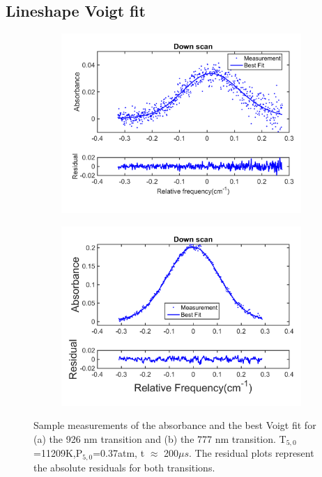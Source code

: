 \documentclass[12pt]{iopart}
\begin{document}
\subsection{Lineshape Voigt fit}
\begin{figure}[h]
  \centering
    \begin{subfigure}[b]{0.4\textwidth}
     \includegraphics[width=\textwidth]{11209K_037atm_abs_down_one_scan_926.png}
    \caption{\label{fig:lineshape_fit_downScan_926} }   
      \end{subfigure} %
    \begin{subfigure}[b]{0.4\textwidth}
     \includegraphics[width=\textwidth]{11209K_037atm_abs_down_one_scan.png}
    \caption{\label{fig:lineshape_fit_downScan_777} }   
      \end{subfigure} %
    \caption{\label{fig:lineshape_fit_777} Sample measurements of the absorbance and the best Voigt fit for (a) the 926 nm transition and (b) the 777 nm transition. T$_{5,0}$=11209K,P$_{5,0}$=0.37atm, t $\approx$ 200$\mu s$. The residual plots represent the absolute residuals for both transitions.}
\end{figure}
\end{document}
